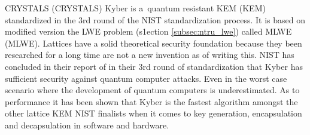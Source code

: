 CRYSTALS (\acl{CRYSTALS}) Kyber is a~quantum resistant KEM (\acl{KEM}) standardized in the 3rd round of the NIST standardization process. It is based on modified version the LWE problem (s1ection \ref{subsec:ntru_lwe}) called MLWE (\acl{MLWE}). Lattices have a solid theoretical security foundation because they been researched for a long time are not a new invention as of writing this. NIST has concluded in their report of in their 3rd round of standardization that Kyber has sufficient security against quantum computer attacks. Even in the worst case scenario where the development of quantum computers is underestimated.   As to performance it has been shown that Kyber is the fastest algorithm amongst the other lattice KEM NIST finalists when it comes to key generation, encapsulation and decapsulation in software and hardware. \cite{Grimes2020}\cite{Alagic2022}

